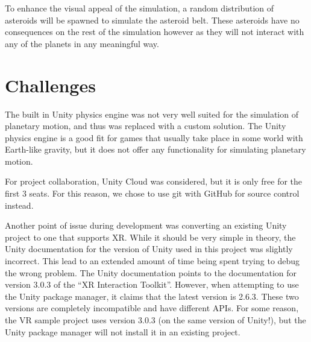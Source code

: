 \documentclass{article}
\begin{document}
    To enhance the visual appeal of the simulation, a random distribution of asteroids will be spawned to simulate the asteroid belt. These asteroids have no consequences on the rest of the simulation however as they will not interact with any of the planets in any meaningful way.
    \section{Challenges}
    The built in Unity physics engine was not very well suited for the simulation of planetary motion, and thus was replaced with a custom solution. The Unity physics engine is a good fit for games that usually take place in some world with Earth-like gravity, but it does not offer any functionality for simulating planetary motion.

    For project collaboration, Unity Cloud was considered, but it is only free for the first 3 seats. For this reason, we chose to use git with GitHub for source control instead.

    Another point of issue during development was converting an existing Unity project to one that supports XR. While it should be very simple in theory, the Unity documentation for the version of Unity used in this project was slightly incorrect. This lead to an extended amount of time being spent trying to debug the wrong problem. The Unity documentation points to the documentation for version 3.0.3 of the ``XR Interaction Toolkit''. However, when attempting to use the Unity package manager, it claims that the latest version is 2.6.3. These two versions are completely incompatible and have different APIs. For some reason, the VR sample project uses version 3.0.3 (on the same version of Unity!), but the Unity package manager will not install it in an existing project.
    \newpage
    
    
\end{document}
